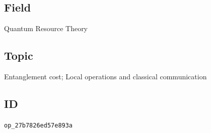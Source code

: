 \subsection*{Field}

Quantum Resource Theory

\subsection*{Topic}

Entanglement cost; Local operations and classical communication

\subsection*{ID}

\texttt{op\_27b7826ed57e893a}
